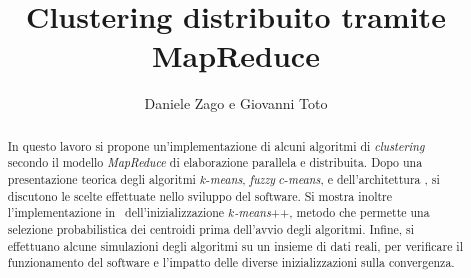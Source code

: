 \documentclass[runningheads]{llncs}
\begin{document}
\title{Clustering distribuito tramite MapReduce}

\author{Daniele Zago e Giovanni Toto}



\maketitle

\begin{abstract}
In questo lavoro si propone un'implementazione di alcuni algoritmi di \textit{clustering} secondo il modello \textit{MapReduce} di elaborazione parallela e distribuita.
Dopo una presentazione teorica degli algoritmi $k$-\textit{means}, \textit{fuzzy} $c$-\textit{means}, e dell'architettura \mr, si discutono le scelte effettuate nello sviluppo del software.
Si mostra inoltre l'implementazione in \mr\ dell'inizializzazione $k$\textit{-means}++, metodo che permette una selezione probabilistica dei centroidi prima dell'avvio degli algoritmi.
Infine, si effettuano alcune simulazioni degli algoritmi su un insieme di dati reali, per verificare il funzionamento del software e l'impatto delle diverse inizializzazioni sulla convergenza.
\end{abstract}
\end{document}
